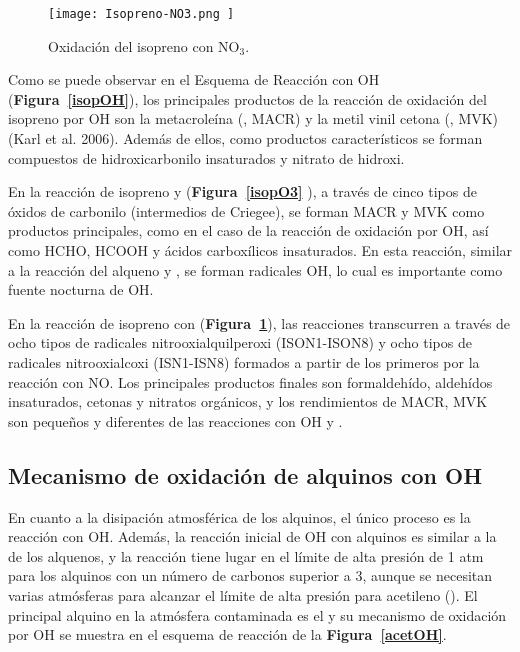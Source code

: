 { \begin{figure}[htbp]
\begin{center}
\texttt{[image: Isopreno-NO3.png ]}
\caption{Oxidación del isopreno con NO$_3$.}
\label{isopNO3}
\end{center}
\end{figure}

Como se puede observar en el Esquema de Reacción con OH (\textbf{Figura~\ref{isopOH}}), los principales productos de la reacción de oxidación del isopreno por OH son la metacroleína (, MACR) y la metil vinil cetona (, MVK) (Karl et al. 2006). Además de ellos, como productos característicos se forman compuestos de hidroxicarbonilo insaturados y nitrato de hidroxi.

En la reacción de isopreno y  (\textbf{Figura~\ref{isopO3}} ), a través de cinco tipos de óxidos de carbonilo (intermedios de Criegee), se forman MACR y MVK como productos principales, como en el caso de la reacción de oxidación por OH, así como HCHO, HCOOH y ácidos carboxílicos insaturados. En esta reacción, similar a la reacción del alqueno y , se forman radicales OH, lo cual es importante como fuente nocturna de OH.

En la reacción de isopreno con  (\textbf{Figura~\ref{isopNO3}}), las reacciones transcurren a través de ocho tipos de radicales nitrooxialquilperoxi (ISON1-ISON8) y ocho tipos de radicales nitrooxialcoxi (ISN1-ISN8) formados a partir de los primeros por la reacción con NO. Los principales productos finales son formaldehído, aldehídos insaturados, cetonas y nitratos orgánicos, y los rendimientos de MACR, MVK son pequeños y diferentes de las reacciones con OH y .

\subsection{Mecanismo de oxidaci\'on de alquinos con OH}
En cuanto a la disipación atmosférica de los alquinos, el único proceso es la reacción con OH. Además, la reacción inicial de OH con alquinos es similar a la de los alquenos, y la reacción tiene lugar en el límite de alta presión de 1 atm para los alquinos con un número de carbonos superior a 3, aunque se necesitan varias atmósferas para alcanzar el límite de alta presión para acetileno (). El principal alquino en la atmósfera contaminada es el  y su mecanismo de oxidación por OH se muestra en el esquema de reacción de la  \textbf{Figura~\ref{acetOH}}.

}

